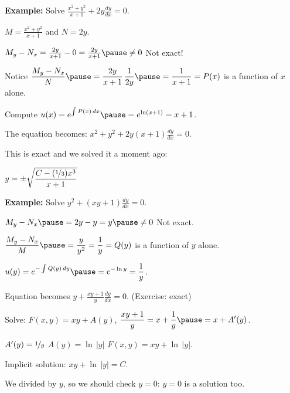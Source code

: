 \documentclass[10pt,aspectratio=169]{beamer}
\begin{document}
\begin{frame}

\textbf{Example:}
Solve \quad
$\displaystyle
\frac{x^2+y^2}{x+1} + 2y \frac{dy}{dx} = 0$.

\medskip
\pause

$M= \frac{x^2+y^2}{x+1}$ and $N=2y$.

\medskip
\pause

$M_y-N_x = \frac{2y}{x+1} - 0 = \frac{2y}{x+1} \pause \not= 0$
\pause
\wthus
Not exact!

\medskip
\pause

Notice
\quad
$\displaystyle
\frac{M_y-N_x}{N}
\pause
= \frac{2y}{x+1} \, \frac{1}{2y}
\pause
= \frac{1}{x+1}
= P(x)
$
\quad
is a function of $x$ alone.

\medskip
\pause

Compute \quad
$u(x) = 
e^{\int  P(x) \, dx}
\pause
=
e^{\ln (x+1)} = x+1$.

\medskip
\pause

The equation becomes: \quad
$\displaystyle
x^2+y^2 + 2y(x+1) \frac{dy}{dx} = 0$.

\medskip
\pause

This is exact and we solved it a moment ago:

\medskip

\quad $\displaystyle y = \pm \sqrt{\frac{C-(\nicefrac{1}{3})x^3}{x+1}}$
\end{frame}

\begin{frame}
\textbf{Example:}
Solve
$\displaystyle
y^2 + (xy+1) \frac{dy}{dx} = 0$.

\medskip
\pause

$M_y-N_x \pause = 2y-y = y \pause \not= 0$
\wthus
Not exact.

\medskip
\pause

$\displaystyle
\frac{M_y-N_x}{M} \pause = \frac{y}{y^2} = \frac{1}{y} =Q(y)$ 
\quad
is a function of $y$ alone.

\medskip
\pause

$\displaystyle
u(y)
= e^{-\int  Q(y) \, dy}
\pause
=
e^{-\ln y} = \frac{1}{y}$.

\medskip
\pause

Equation becomes
\quad
$\displaystyle y + \frac{xy+1}{y} \frac{dy}{dx} = 0$. \quad (Exercise: exact)

\medskip
\pause

Solve: \quad
$F(x,y) = xy + A(y)$,
\pause
\quad
$\displaystyle
\frac{xy+1}{y} = x+\frac{1}{y} \pause = x+ A'(y)$.

\medskip
\pause

$A'(y) = \nicefrac{1}{y}$
\pause
\wthus
$A(y) = \ln \, \lvert y \rvert$
\pause
\wthus
 $F(x,y) = xy + \ln \, \lvert y \rvert$.

\medskip
\pause

Implicit solution:
$xy + \ln \, \lvert y \rvert = C$.

\medskip
\pause

We divided by $y$, so we should check $y=0$:
\pause
\quad
$y=0$ is a solution too.
\end{frame}
\end{document}
